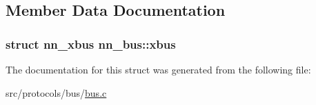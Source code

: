 \subsection{Member Data Documentation}
\subsubsection[{xbus}]{\setlength{\rightskip}{0pt plus 5cm}struct {\bf nn\+\_\+xbus} nn\+\_\+bus\+::xbus}\hypertarget{structnn__bus_a4e1cacf22f06d92e9707e3ca357072fe}{}\label{structnn__bus_a4e1cacf22f06d92e9707e3ca357072fe}


The documentation for this struct was generated from the following file\+:\begin{DoxyCompactItemize}
\item 
src/protocols/bus/\hyperlink{src_2protocols_2bus_2bus_8c}{bus.\+c}\end{DoxyCompactItemize}
